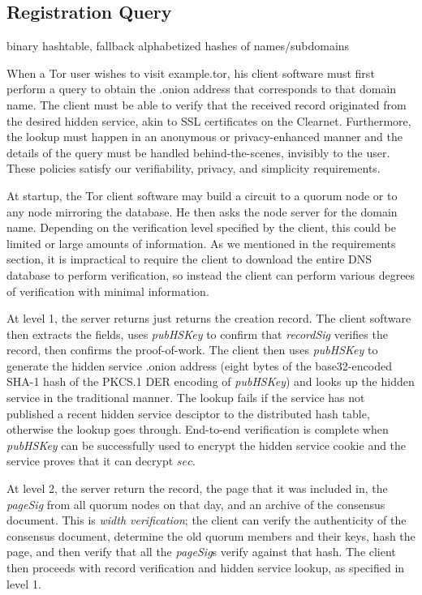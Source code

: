 \subsection{Registration Query}


binary hashtable, fallback alphabetized hashes of names/subdomains


When a Tor user wishes to visit example.tor, his client software must first perform a query to obtain the .onion address that corresponds to that domain name. The client must be able to verify that the received record originated from the desired hidden service, akin to SSL certificates on the Clearnet. Furthermore, the lookup must happen in an anonymous or privacy-enhanced manner and the details of the query must be handled behind-the-scenes, invisibly to the user. These policies satisfy our verifiability, privacy, and simplicity requirements.

At startup, the Tor client software may build a circuit to a quorum node or to any node mirroring the database. He then asks the node server for the domain name. Depending on the verification level specified by the client, this could be limited or large amounts of information. As we mentioned in the requirements section, it is impractical to require the client to download the entire DNS database to perform verification, so instead the client can perform various degrees of verification with minimal information.

At level 1, the server returns just returns the creation record. The client software then extracts the fields, uses \textit{pubHSKey} to confirm that \textit{recordSig} verifies the record, then confirms the proof-of-work. The client then uses \textit{pubHSKey} to generate the hidden service .onion address (eight bytes of the base32-encoded SHA-1 hash of the PKCS.1 DER encoding of \textit{pubHSKey}) and looks up the hidden service in the traditional manner. The lookup fails if the service has not published a recent hidden service desciptor to the distributed hash table, otherwise the lookup goes through. End-to-end verification is complete when \textit{pubHSKey} can be successfully used to encrypt the hidden service cookie and the service proves that it can decrypt $ sec $.

At level 2, the server return the record, the page that it was included in, the \textit{pageSig} from all quorum nodes on that day, and an archive of the consensus document. This is \textit{width verification}; the client can verify the authenticity of the consensus document, determine the old quorum members and their keys, hash the page, and then verify that all the \textit{pageSig}s verify against that hash. The client then proceeds with record verification and hidden service lookup, as specified in level 1.

